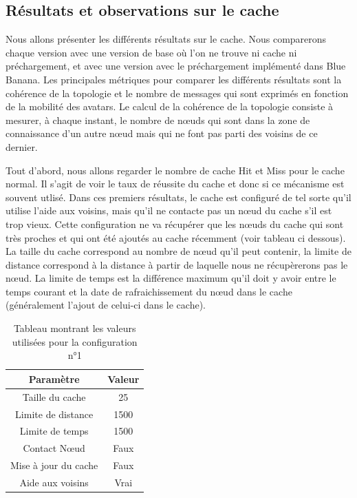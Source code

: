 \subsection{Résultats et observations sur le cache}
\label{resObsCache}

Nous allons présenter les différents résultats sur le cache. Nous comparerons chaque version avec une version de base où l'on ne trouve ni cache ni préchargement, et avec une version avec le préchargement implémenté dans Blue Banana.
Les principales métriques pour comparer les différents résultats sont la cohérence de la topologie et le nombre de messages qui sont exprimés en fonction de la mobilité des avatars. Le calcul de la cohérence de la topologie consiste à mesurer, à chaque instant, le nombre de nœuds qui sont dans la zone de connaissance d'un autre nœud mais qui ne font pas parti des voisins de ce dernier.

\par Tout d'abord, nous allons regarder le nombre de cache Hit et Miss pour le cache normal. Il s'agit de voir le taux de réussite du cache et donc si ce mécanisme est souvent utlisé. Dans ces premiers résultats, le cache est configuré de tel sorte qu'il utilise l'aide aux voisins, mais qu'il ne contacte pas un nœud du cache s'il est trop vieux. Cette configuration ne va récupérer que les nœuds du cache qui sont très proches et qui ont été ajoutés au cache récemment (voir tableau ci dessous). La taille du cache correspond au nombre de nœud qu'il peut contenir, la limite de distance correspond à la distance à partir de laquelle nous ne récupèrerons pas le nœud. La limite de temps est la différence maximum qu'il doit y avoir entre le temps courant et la date de rafraichissement du nœud dans le cache (généralement l'ajout de celui-ci dans le cache). 
\begin{table}[!h]
  \begin{center}
    \begin{tabular}{|c|c|}
      \hline
      Paramètre & Valeur\\
      \hline
      Taille du cache & 25\\
      Limite de distance &  1500\\
      Limite de temps & 1500\\
      Contact Nœud & Faux\\
      Mise à jour du cache & Faux\\
      Aide aux voisins & Vrai\\
      \hline
    \end{tabular}
  \end{center}
  \label{tab:config1}
  \caption{Tableau montrant les valeurs utilisées pour la configuration n°1}
\end{table}



